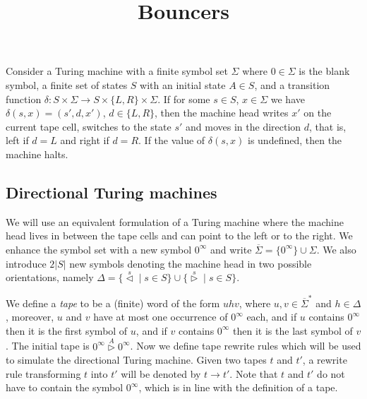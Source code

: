 \documentclass{article}
\title{Bouncers}
\newcommand{\lhead}[1]{\stackrel{#1}\triangleleft}
\newcommand{\rhead}[1]{\stackrel{#1}\triangleright}
\begin{document}
\maketitle

Consider a Turing machine with a finite symbol set \( \Sigma \) where \( 0 \in \Sigma \) is the blank symbol,
a finite set of states \( S \) with an initial state \( A \in S \), and a transition function \( \delta : S \times \Sigma \to S \times \{ L, R \} \times \Sigma \).
If for some \( s \in S \), \( x \in \Sigma \) we have \( \delta(s, x) = (s', d, x') \), \( d \in \{ L, R \} \), then the machine head writes \( x' \)
on the current tape cell, switches to the state \( s' \) and moves in the direction \( d \), that is, left if \( d = L \) and right if \( d = R \).
If the value of \( \delta(s, x) \) is undefined, then the machine halts.

\subsection{Directional Turing machines}

We will use an equivalent formulation of a Turing machine where the machine head lives in between the tape cells and can point to the left or to the right.
We enhance the symbol set with a new symbol \( 0^\infty \) and write \( \overline{\Sigma} = \{ 0^\infty \} \cup \Sigma \).
We also introduce \( 2 |S| \) new symbols denoting the machine head in two possible orientations, namely \( \Delta = \{ \lhead{s} \mid s \in S \} \cup \{ \rhead{s} \mid s \in S \} \).

We define a \emph{tape} to be a (finite) word of the form \( u h v \), where \( u, v \in \overline{\Sigma}^* \) and \( h \in \Delta \),
moreover, \( u \) and \( v \) have at most one occurrence of \( 0^\infty \) each, and if \( u \) contains \( 0^\infty \) then it is the first symbol of \( u \),
and if \( v \) contains \( 0^\infty \) then it is the last symbol of \( v \).
The initial tape is \( 0^\infty \rhead{A} 0^\infty \). Now we define tape rewrite rules which will be used to simulate the directional Turing machine.
Given two tapes \( t \) and \( t' \), a rewrite rule transforming \( t \) into \( t' \) will be denoted by \( t \to t' \).
Note that \( t \) and \( t' \) do not have to contain the symbol \( 0^\infty \), which is in line with the definition of a tape.
\end{document}
